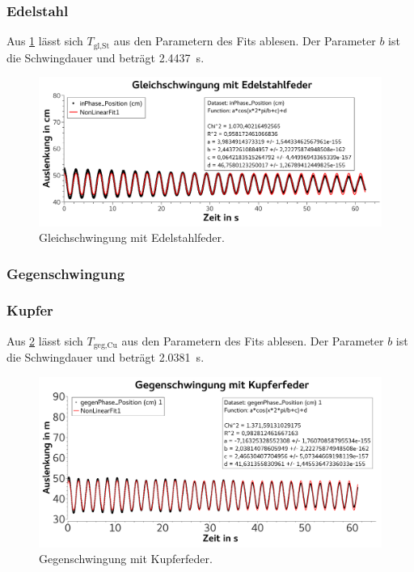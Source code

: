 \documentclass[
	a4paper,
	12pt,
	pagesize,
	ngerman
]{scrartcl}
\begin{document}
	\subsubsection*{Edelstahl}
	Aus \cref{EdelstahlGleichschwingung} lässt sich $T_\text{gl,St}$ aus den Parametern des Fits ablesen. Der Parameter $b$ ist die Schwingdauer und beträgt \SI{2,4437}{s}.
	\begin{figure}[H]
		\includegraphics[width=1\textwidth]{EdelstahlGleichschwingung}
		\centering
		\caption{Gleichschwingung mit Edelstahlfeder.}
		\label{EdelstahlGleichschwingung}
		\centering
	\end{figure}


	\subsubsection{Gegenschwingung}

	\subsubsection*{Kupfer}
	Aus \cref{KupferGegenschwingung} lässt sich $T_\text{geg,Cu}$ aus den Parametern des Fits ablesen. Der Parameter $b$ ist die Schwingdauer und beträgt \SI{2,0381}{s}.
	\begin{figure}[H]
		\includegraphics[width=1\textwidth]{KupferGegenschwingung}
		\centering
		\caption{Gegenschwingung mit Kupferfeder.}
		\label{KupferGegenschwingung}
		\centering
	\end{figure}
\end{document}
